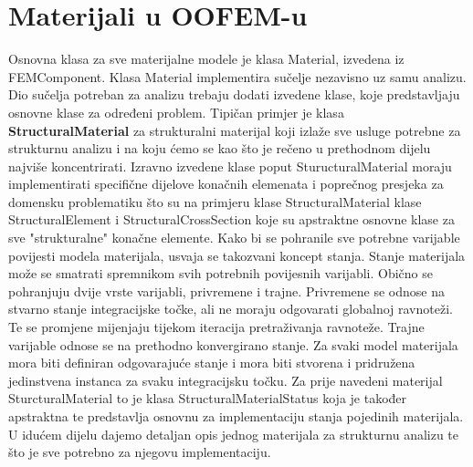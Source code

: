 \documentclass[a4paper,twoside,12pt]{memoir} %
\begin{document}
\section{Materijali u OOFEM-u}
\label{poglavlje:materials_in_oofem}
Osnovna klasa za sve materijalne modele je klasa Material, izvedena iz FEMComponent. Klasa Material implementira sučelje nezavisno uz samu analizu. Dio sučelja potreban za analizu trebaju dodati izvedene klase, koje predstavljaju osnovne klase za određeni problem. Tipičan primjer je klasa \textbf{StructuralMaterial} za strukturalni materijal koji izlaže sve usluge potrebne za strukturnu analizu i na koju ćemo se kao što je rečeno u prethodnom dijelu najviše koncentrirati. Izravno izvedene klase poput SturucturalMaterial moraju implementirati specifične dijelove konačnih elemenata i poprečnog presjeka za domensku problematiku što su na primjeru klase StructuralMaterial klase StructuralElement i StructuralCrossSection koje su apstraktne osnovne klase za sve "strukturalne" konačne elemente.
Kako bi se pohranile sve potrebne varijable povijesti modela materijala, usvaja se takozvani koncept stanja. Stanje materijala može se smatrati spremnikom svih potrebnih povijesnih varijabli. Obično se pohranjuju dvije vrste varijabli, privremene i trajne. Privremene se odnose na stvarno stanje integracijske točke, ali ne moraju odgovarati globalnoj ravnoteži. Te se promjene mijenjaju tijekom iteracija pretraživanja ravnoteže. Trajne varijable odnose se na prethodno konvergirano stanje. Za svaki model materijala mora biti definiran odgovarajuće stanje i mora biti stvorena i pridružena jedinstvena instanca za svaku integracijsku točku. Za prije navedeni materijal SturcturalMaterial to je klasa StructuralMaterialStatus koja je također apstraktna te predstavlja osnovnu za implementaciju stanja pojedinih materijala. U idućem dijelu dajemo detaljan opis jednog materijala za strukturnu analizu te što je sve potrebno za njegovu implementaciju.
\end{document}
